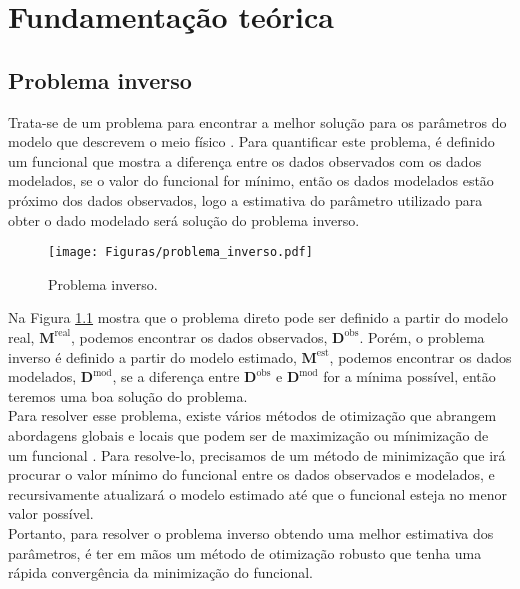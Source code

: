 \chapter{Fundamentação teórica}

\section{Problema inverso}
Trata-se de um problema para encontrar a melhor solução para os parâmetros do modelo que descrevem o meio físico \citep{newton_1982}. Para quantificar este problema, é definido um funcional que mostra a diferença entre os dados observados com os dados modelados, se o valor do funcional for mínimo, então os dados modelados estão próximo dos dados observados, logo a estimativa do parâmetro utilizado para obter o dado modelado será solução do problema inverso.
\begin{figure}[htb]
\centering
\texttt{[image: Figuras/problema\_inverso.pdf]}
\caption{Problema inverso.} 
\label{fig:problema_inverso}
\end{figure}

Na Figura \ref{fig:problema_inverso} mostra que o problema direto pode ser definido a partir do modelo real, $\mathbf{\text{M}}^{\text{real}}$, podemos encontrar os dados observados, $\mathbf{\text{D}}^{\text{obs}}$. Porém, o problema inverso é definido a partir do modelo estimado,   $\mathbf{\text{M}}^{\text{est}}$, podemos encontrar os dados modelados, $\mathbf{\text{D}}^{\text{mod}}$, se a diferença entre  $\mathbf{\text{D}}^{\text{obs}}$ e $\mathbf{\text{D}}^{\text{mod}}$ for a mínima possível, então teremos uma boa solução do problema. \\

Para resolver esse problema, existe vários métodos de otimização que abrangem abordagens globais e locais que podem ser de maximização ou mínimização de um funcional \citep{nocedal_2006}. Para resolve-lo, precisamos de um método de minimização que irá procurar o valor mínimo do funcional entre os dados observados e modelados, e recursivamente atualizará o modelo estimado até que o funcional esteja no menor valor possível. \\
 
Portanto, para resolver o problema inverso obtendo uma melhor estimativa dos parâmetros, é ter em mãos um método de otimização robusto que tenha uma rápida convergência da minimização do funcional.
\newpage
